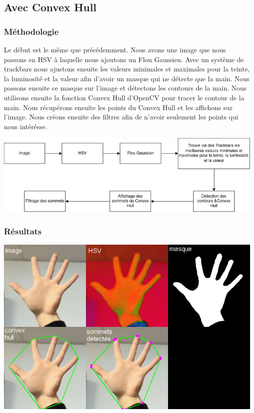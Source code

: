 \documentclass[11pt]{article}
\begin{document}
\newpage


\subsection{Avec Convex Hull}
\subsubsection{Méthodologie}
Le début est le même que précédemment. Nous avons une image que nous passons en HSV à laquelle nous ajoutons un Flou Gaussien. Avec un système de trackbars nous ajustons ensuite les valeurs minimales et maximales pour la teinte, la luminosité et la valeur afin d'avoir un masque qui ne détecte que la main. Nous passons ensuite ce masque sur l'image et détectons les contours de la main. Nous utilisons ensuite la fonction Convex Hull d'OpenCV pour tracer le contour de la main. Nous récupérons ensuite les points du Convex Hull et les affichons sur l'image. Nous créons ensuite des filtres afin de n'avoir seulement les points qui nous intérésse. \bigbreak

\begin{center}
    \includegraphics[width=\textwidth]{images/pipeline_detect_fingers_avec_convex_hull.png}
    \label{fig:pipeline_detect_fingers_avec_convex_hull}
\end{center}

\subsubsection{Résultats}

\begin{center}
    \includegraphics[width=\textwidth]{images/res_5_convex_hull_no_filter_pt.png}
    \label{fig:res_5_convex_hull_no_filter_pt}
\end{center}
\end{document}
